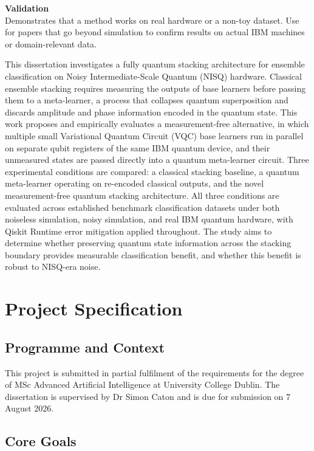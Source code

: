 \documentclass[]{UCD_CS_FYP_Report}
\newcommand{\validation}[1]{{\color{green!60!black}#1}}
\begin{document}
\bigskip

\validation{\large \textbf{Validation}\\
\normalsize Demonstrates that a method works on real hardware or a non-toy dataset. Use for papers that go beyond simulation to confirm results on actual IBM machines or domain-relevant data.}

\newpage

\abstract
This dissertation investigates a fully quantum stacking architecture for ensemble classification on Noisy Intermediate-Scale Quantum (NISQ) hardware. Classical ensemble stacking requires measuring the outputs of base learners before passing them to a meta-learner, a process that collapses quantum superposition and discards amplitude and phase information encoded in the quantum state. This work proposes and empirically evaluates a measurement-free alternative, in which multiple small Variational Quantum Circuit (VQC) base learners run in parallel on separate qubit registers of the same IBM quantum device, and their unmeasured states are passed directly into a quantum meta-learner circuit. Three experimental conditions are compared: a classical stacking baseline, a quantum meta-learner operating on re-encoded classical outputs, and the novel measurement-free quantum stacking architecture. All three conditions are evaluated across established benchmark classification datasets under both noiseless simulation, noisy simulation, and real IBM quantum hardware, with Qiskit Runtime error mitigation applied throughout. The study aims to determine whether preserving quantum state information across the stacking boundary provides measurable classification benefit, and whether this benefit is robust to NISQ-era noise.

\chapter{Project Specification}

\section{Programme and Context}

This project is submitted in partial fulfilment of the requirements for the degree of MSc Advanced Artificial Intelligence at University College Dublin. The dissertation is supervised by Dr Simon Caton and is due for submission on 7 August 2026.

\section{Core Goals}
\end{document}
